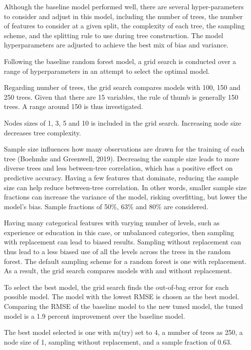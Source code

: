 \documentclass[11pt,preprint, authoryear]{elsarticle}
\numberwithin{equation}{section}
\numberwithin{figure}{section}
\numberwithin{table}{section}
\begin{document}
Although the baseline model performed well, there are several
hyper-parameters to consider and adjust in this model, including the
number of trees, the number of features to consider at a given split,
the complexity of each tree, the sampling scheme, and the splitting rule
to use during tree construction. The model hyperparameters are adjusted
to achieve the best mix of bias and variance.

Following the baseline random forest model, a grid search is conducted
over a range of hyperparameters in an attempt to select the optimal
model.

Regarding number of trees, the grid search compares models with 100, 150
and 250 trees. Given that there are 15 variables, the rule of thumb is
generally 150 trees. A range around 150 is thus investigated.

Nodes sizes of 1, 3, 5 and 10 is included in the grid search. Increasing
node size decreases tree complexity.

Sample size influences how many observations are drawn for the training
of each tree (Boehmke and Greenwell, 2019). Decreasing the sample size
leads to more diverse trees and less between-tree correlation, which has
a positive effect on predictive accuracy. Having a few features that
dominate, reducing the sample size can help reduce between-tree
correlation. In other words, smaller sample size fractions can increase
the variance of the model, risking overfitting, but lower the model's
bias. Sample fractions of 50\%, 63\% and 80\% are considered.

Having many categorical features with varying number of levels, such as
experience or education in this case, or unbalanced categories, then
sampling with replacement can lead to biased results. Sampling without
replacement can thus lead to a less biased use of all the levels across
the trees in the random forest. The default sampling scheme for a random
forest is one with replacement. As a result, the grid search compares
models with and without replacement.

To select the best model, the grid search finds the out-of-bag error for
each possible model. The model with the lowest RMSE is chosen as the
best model. Comparing the RMSE of the baseline model to the new tuned
model, the tuned model is a 1.9 percent improvement over the baseline
model.

The best model selected is one with m(try) set to 4, a number of trees
as 250, a node size of 1, sampling without replacement, and a sample
fraction of 0.63.
\end{document}

